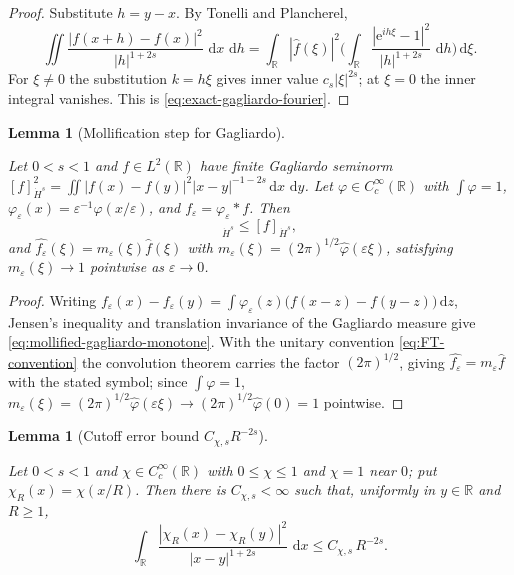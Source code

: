 \documentclass[11pt,oneside]{book}
\providecommand{\uses}[1]{}
\newtheorem{lemma}[theorem]{Lemma}
\theoremstyle{definition}
\theoremstyle{remark}
\newcommand{\R}{\mathbb R}
\newcommand{\1}{\mathbf 1}
\newcommand{\dd}{\,\mathrm d}
\newcommand{\abs}[1]{\left\lvert #1\right\rvert}
\newcommand{\e}{\mathrm e}
\newcommand{\eps}{\varepsilon}
\begin{document}
\begin{proof}
\uses{def:fourier-convention}
Substitute $h=y-x$. By Tonelli and Plancherel,
\[
 \iint\frac{\abs{f(x+h)-f(x)}^2}{\abs{h}^{1+2s}}\,\dd x\,\dd h
 =\int_\R\abs{\widehat f(\xi)}^2
   \Big(\int_\R\frac{\abs{\e^{ih\xi}-1}^2}{\abs{h}^{1+2s}}\,\dd h\Big)\dd\xi.
\]
For $\xi\ne0$ the substitution $k=h\xi$ gives inner value $c_s\abs{\xi}^{2s}$;
at $\xi=0$ the inner integral vanishes. This is
\eqref{eq:exact-gagliardo-fourier}.
\end{proof}

\begin{lemma}[Mollification step for Gagliardo]\label{lem:gagliardo-mollification}
\uses{def:Hs-space}
Let $0<s<1$ and $f\in L^2(\R)$ have finite Gagliardo seminorm
$[f]_{\dot H^s}^2=\iint\abs{f(x)-f(y)}^2\abs{x-y}^{-1-2s}\dd x\,\dd y$. Let
$\varphi\in C_c^\infty(\R)$ with $\int\varphi=1$, $\varphi_\eps(x)=\eps^{-1}\varphi(x/\eps)$,
and $f_\eps=\varphi_\eps*f$. Then
\begin{equation}
 [f_\eps]_{\dot H^s}\le[f]_{\dot H^s},
 \label{eq:mollified-gagliardo-monotone}
\end{equation}
and $\widehat{f_\eps}(\xi)=m_\eps(\xi)\widehat f(\xi)$ with
$m_\eps(\xi)=(2\pi)^{1/2}\widehat\varphi(\eps\xi)$, satisfying $m_\eps(\xi)\to1$
pointwise as $\eps\to0$.
\end{lemma}

\begin{proof}
\uses{lem:gagliardo-fourier-identity}
Writing $f_\eps(x)-f_\eps(y)=\int\varphi_\eps(z)\big(f(x-z)-f(y-z)\big)\dd z$,
Jensen's inequality and translation invariance of the Gagliardo measure give
\eqref{eq:mollified-gagliardo-monotone}. With the unitary convention
\eqref{eq:FT-convention} the convolution theorem carries the factor
$(2\pi)^{1/2}$, giving $\widehat{f_\eps}=m_\eps\widehat f$ with the stated
symbol; since $\int\varphi=1$, $m_\eps(\xi)=(2\pi)^{1/2}\widehat\varphi(\eps\xi)\to
(2\pi)^{1/2}\widehat\varphi(0)=1$ pointwise.
\end{proof}

\begin{lemma}[Cutoff error bound $C_{\chi,s}R^{-2s}$]\label{lem:gagliardo-cutoff-error}
\uses{def:Hs-space}
Let $0<s<1$ and $\chi\in C_c^\infty(\R)$ with $0\le\chi\le1$ and $\chi=1$ near
$0$; put $\chi_R(x)=\chi(x/R)$. Then there is $C_{\chi,s}<\infty$ such that,
uniformly in $y\in\R$ and $R\ge1$,
\begin{equation}
 \int_\R\frac{\abs{\chi_R(x)-\chi_R(y)}^2}{\abs{x-y}^{1+2s}}\,\dd x
 \le C_{\chi,s}\,R^{-2s}.
 \label{eq:cutoff-gagliardo-error}
\end{equation}
\end{lemma}
\end{document}
